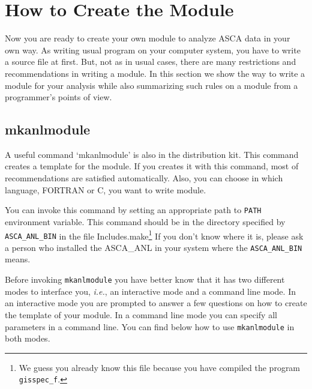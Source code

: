 \section{How to Create the Module}
Now you are ready to create
your own module to analyze ASCA data in your own way.
As writing usual program on your computer system,
you have to write a source file at first.
But,
not as in usual cases,
there are many restrictions and recommendations in writing a module.
In this section
we show the way to write a module for your analysis
while also summarizing such rules on a module
from a programmer's points of view.

\subsection{mkanlmodule}
A useful command `mkanlmodule' is also in the distribution kit.
This command creates a template for the module.
If you creates it with this command,
most of recommendations are satisfied automatically.
Also,
you can choose in which language, FORTRAN or C, you want to write module.

You can invoke this command
by setting an appropriate path to {\tt PATH} environment variable.
This command should be in the directory specified by {\tt ASCA\_ANL\_BIN}
in the file Includes.make\footnote{
We guess you already know this file
because you have compiled the program {\tt gisspec\_f}.
}
If you don't know where it is,
please ask a person who installed the ASCA\_ANL in your system
where the {\tt ASCA\_ANL\_BIN} means.

Before invoking {\tt mkanlmodule}
you have better know that it has two different modes to interface you,
{\em i.e.},
an interactive mode and a command line mode.
In an interactive mode
you are prompted to answer a few questions
on how to create the template of your module.
In a command line mode
you can specify all parameters in a command line.
You can find below how to use {\tt mkanlmodule} in both modes.

